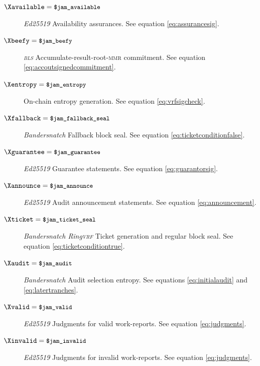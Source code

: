 \begin{description}
  \item[$\Xavailable = \token{\$jam\_available}$] \emph{Ed25519} Availability assurances. See equation \ref{eq:assurancesig}.
  \item[$\Xbeefy = \token{\$jam\_beefy}$] \emph{\textsc{bls}} Accumulate-result-root-\textsc{mmr} commitment. See equation \ref{eq:accoutsignedcommitment}.
  \item[$\Xentropy = \token{\$jam\_entropy}$] On-chain entropy generation. See equation \ref{eq:vrfsigcheck}.
  \item[$\Xfallback = \token{\$jam\_fallback\_seal}$] \emph{Bandersnatch} Fallback block seal. See equation \ref{eq:ticketconditionfalse}.
  \item[$\Xguarantee = \token{\$jam\_guarantee}$] \emph{Ed25519} Guarantee statements. See equation \ref{eq:guarantorsig}.
  \item[$\Xannounce = \token{\$jam\_announce}$] \emph{Ed25519} Audit announcement statements. See equation \ref{eq:announcement}.
  \item[$\Xticket = \token{\$jam\_ticket\_seal}$] \emph{Bandersnatch Ring\textsc{vrf}} Ticket generation and regular block seal. See equation \ref{eq:ticketconditiontrue}.
  \item[$\Xaudit = \token{\$jam\_audit}$] \emph{Bandersnatch} Audit selection entropy. See equations \ref{eq:initialaudit} and \ref{eq:latertranches}.
  \item[$\Xvalid = \token{\$jam\_valid}$] \emph{Ed25519} Judgments for valid work-reports. See equation \ref{eq:judgments}.
  \item[$\Xinvalid = \token{\$jam\_invalid}$] \emph{Ed25519} Judgments for invalid work-reports. See equation \ref{eq:judgments}.
\end{description}
